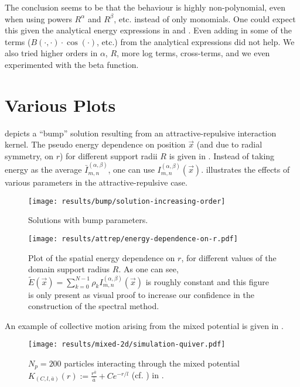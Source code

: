 The conclusion seems to be that the behaviour is highly non-polynomial, even when using powers $R^\alpha$ and $R^\beta$, etc. instead of only monomials.
One could expect this given the analytical energy expressions in  and \cite{2017-explicit-solutions}.
Even adding in some of the terms ($B(\cdot, \cdot) \cdot \cos(\cdot)$, etc.) from the analytical expressions did not help.
We also tried higher orders in $\alpha$, $R$, more log terms, cross-terms, and we even experimented with the beta function.

\chapter{Various Plots}
\label{appendix:various-plots}
 depicts a ``bump'' solution resulting from an attractive-repulsive interaction kernel.
The pseudo energy dependence on position $\vec{x}$ (and due to radial symmetry, on $r$) for different support radii $R$ is given in .
Instead of taking energy as the average $\bar{I}_{m,n}^{(\alpha,\beta)}$, one can use ${I}_{m,n}^{(\alpha,\beta)}(\vec{x})$.
 illustrates the effects of various parameters in the attractive-repulsive case.

\begin{figure}[H]
  \centering
  \texttt{[image: results/bump/solution-increasing-order]}
  \caption[Bump parameter solutions]{Solutions with bump parameters.}
  \label{fig:bump-solutions}
\end{figure}

\begin{figure}[H]
  \centering
  \texttt{[image: results/attrep/energy-dependence-on-r.pdf]}
  \caption[Spatial energy dependence on $r$]{Plot of the spatial energy dependence on $r$, for different values of the domain support radius $R$. As one can see, $\tilde{E}(\vec{x}) = \sum_{k=0}^{N-1} \rho_k {I}_{m,n}^{(\alpha,\beta)}(\vec{x})$ is roughly constant and this figure is only present as visual proof to increase our confidence in the construction of the spectral method.}
  \label{fig:spatial-energy-dependence}
\end{figure}
\pagebreak

An example of collective motion arising from the mixed potential is given in .

\begin{figure}[H]
  \centering
  \texttt{[image: results/mixed-2d/simulation-quiver.pdf]}
  \caption[2D quiver plot for the mixed potential]{$N_p = 200$ particles interacting through the mixed potential $K_{(C, l, \bar{a})}(r) := \frac{r^{\bar{a}}}{\bar{a}} + C e^{-r/l}$ (cf. ) in .}
  \label{fig:mixed-2d-quiver}
\end{figure}


